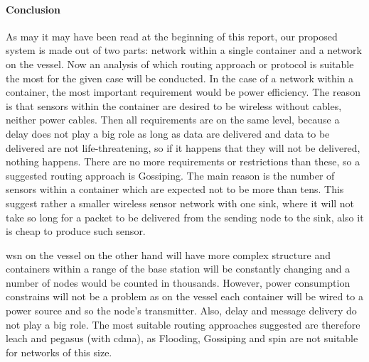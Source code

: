 \paragraph{Conclusion}
As may it may have been read at the beginning of this report, our proposed system is made out of two parts: network within a single container and a network on the vessel. Now an analysis of which routing approach or protocol is suitable the most for the given case will be conducted. 
In the case of a network within a container, the most important requirement would be power efficiency. The reason is that sensors within the container are desired to be wireless without cables, neither power cables. Then all requirements are on the same level, because a delay does not play a big role as long as data are delivered and data to be delivered are not life-threatening, so if it happens that they will not be delivered, nothing happens. There are no more requirements or restrictions than these, so a suggested routing approach is Gossiping. The main reason is the number of sensors within a container which are expected not to be more than tens. This suggest rather a smaller wireless sensor network with one sink, where it will not take so long for a packet to be delivered from the sending node to the sink, also it is cheap to produce such sensor.

\acrshort{wsn} on the vessel on the other hand will have more complex structure and containers within a range of the base station will be constantly changing and a number of nodes would be counted in thousands. However, power consumption constrains will not be a problem as on the vessel each container will be wired to a power source and so the node’s transmitter. Also, delay and message delivery do not play a big role. The most suitable routing approaches suggested are therefore \acrshort{leach} and \acrshort{pegasus} (with \acrshort{cdma}), as Flooding, Gossiping and \acrshort{spin} are not suitable for networks of this size.

